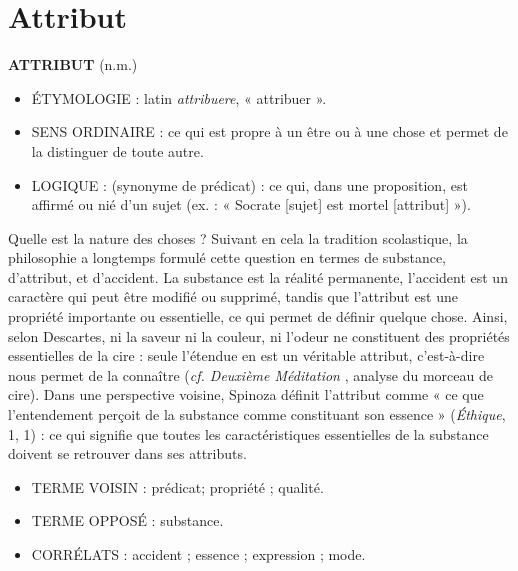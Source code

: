 
\chapter{Attribut}

{\bf A{\footnotesize TTRIBUT}} (n.m.)

\begin{itemize}[leftmargin=1cm, label=, itemsep=1pt]
\item {\footnotesize ÉTYMOLOGIE} : latin {\it attribuere},
« attribuer ».
\item {\footnotesize SENS ORDINAIRE} : ce qui
est propre à un être ou à une chose
et permet de la distinguer de toute
autre.
\item {\footnotesize LOGIQUE} : (synonyme de prédicat) : ce qui, dans une proposition,
est affirmé ou nié d’un sujet (ex. :
« Socrate [sujet] est mortel [attribut] »).
\end{itemize}

Quelle est la nature des choses ? Suivant en
cela la tradition scolastique, la philosophie
a longtemps formulé cette question en
termes de substance, d’attribut, et d’accident. La substance est la réalité permanente, l’accident est un caractère qui peut
être modifié ou supprimé, tandis que l’attribut est une propriété importante ou
essentielle, ce qui permet de définir
quelque chose. Ainsi, selon Descartes, ni
la saveur ni la couleur, ni l'odeur ne constituent des propriétés essentielles de la cire :
seule l’étendue en est un véritable attribut,
c'est-à-dire nous permet de la connaître ({\it cf. Deuxième Méditation}
, analyse du morceau
de cire). Dans une perspective voisine, Spinoza définit l’attribut comme « ce que
l'entendement perçoit de la substance
comme constituant son essence »
({\it Éthique}, 1, 1) : ce qui signifie que toutes
les caractéristiques essentielles de la substance doivent se retrouver dans ses attributs.

\begin{itemize}[leftmargin=1cm, label=, itemsep=1pt]
\item {\footnotesize TERME VOISIN} : prédicat; propriété ; qualité.
\item {\footnotesize TERME OPPOSÉ} : substance.
\item {\footnotesize CORRÉLATS} : accident ;
essence ; expression ; mode.
\end{itemize}


